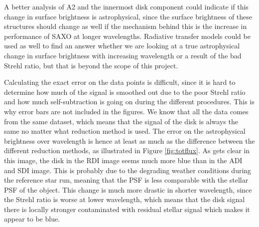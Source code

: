\documentclass[twoside,single,12pt]{lion-msc}
\begin{document}
A better analysis of A2 and the innermost disk component could indicate if this change in surface brightness is astrophysical, since the surface brightness of these structures should change as well if the mechanism behind this is the increase in performance of SAXO at longer wavelengths. Radiative transfer models could be used as well to find an answer whether we are looking at a true astrophysical change in surface brightness with increasing wavelength or a result of the bad Strehl ratio, but that is beyond the scope of this project.
\bigskip

Calculating the exact error on the data points is difficult, since it is hard to determine how much of the signal is smoothed out due to the poor Strehl ratio and how much self-subtraction is going on during the different procedures. This is why error bars are not included in the figures. We know that all the data comes from the same dataset, which means that the signal of the disk is always the same no matter what reduction method is used. The error on the astrophysical brightness over wavelength is hence at least as much as the difference between the different reduction methods, as illustrated in Figure \ref{fig:totflux}. As gets clear in this image, the disk in the RDI image seems much more blue than in the ADI and SDI image. This is probably due to the degrading weather conditions during the reference star run, meaning that the PSF is less comparable with the stellar PSF of the object. This change is much more drastic in shorter wavelength, since the Strehl ratio is worse at lower wavelength, which means that the disk signal there is locally stronger contaminated with residual stellar signal which makes it appear to be blue.
\bigskip
\end{document}
